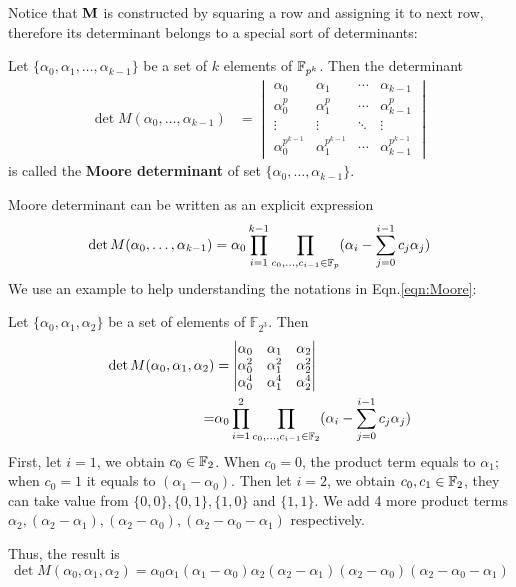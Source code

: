 Notice that ${\bf M}$ is constructed by squaring a row and assigning it to next row,
therefore its determinant belongs to a special sort of determinants:
\begin{Definition}
Let $\{\alpha_0,\alpha_1,\dots,\alpha_{k-1}\}$ be a set of $k$ elements of ${\mathbb{F}}_{p^k}$. Then the determinant
\begin{align}
\det{M(\alpha_0,\dots,\alpha_{k-1})} &= 
\begin{vmatrix}
\alpha_0 & \alpha_1 & \cdots & \alpha_{k-1} \\
\alpha_0^p & \alpha_1^p & \cdots & \alpha_{k-1}^p \\
\vdots & \vdots & \ddots & \vdots \\
\alpha_0^{p^{k-1}} & \alpha_1^{p^{k-1}} & \cdots & \alpha_{k-1}^{p^{k-1}}
\end{vmatrix}
\end{align}
is called the {\bf Moore determinant} of set $\{\alpha_0,\dots,\alpha_{k-1}\}$.
\end{Definition}
Moore determinant can be written as an explicit expression
\begin{equation}
\label{eqn:Moore}
\det{M(\alpha_0,\dots,\alpha_{k-1})} = \alpha_0 \prod_{i=1}^{k-1} \prod_{c_0,\dots,c_{i-1}\in \Fp} (\alpha_{i} - \sum_{j=0}^{i-1}c_j\alpha_j)
\end{equation}
We use an example to help understanding the notations in Eqn.\ref{eqn:Moore}:
\begin{Example}
Let $\{\alpha_0,\alpha_1,\alpha_2\}$ be a set of elements of $\mathbb F_{2^3}$. Then
\begin{align}
\det{M(\alpha_0,\alpha_1,\alpha_2)} &= 
\begin{vmatrix}
\alpha_0 & \alpha_1 & \alpha_2 \\
\alpha_0^2 & \alpha_1^2 & \alpha_2^2 \\
\alpha_0^4 & \alpha_1^4 & \alpha_2^4
\end{vmatrix} \\ \nonumber
=& \alpha_0 \prod_{i=1}^{2} \prod_{c_0,\dots,c_{i-1}\in {\mathbb{F}}_{2}} (\alpha_{i} - \displaystyle\sum_{j=0}^{i-1}c_j\alpha_j)
\end{align}
First, let $i=1$,  we obtain $c_0\in {\mathbb{F}}_{2}$. When $c_0=0$, the product term equals to $\alpha_1$; when $c_0=1$ it equals to $(\alpha_1-\alpha_0)$.
Then let $i=2$, we obtain ${c_0,c_1}\in {\mathbb{F}}_{2}$, they can take value from $\{0,0\},\{0,1\},\{1,0\}$ and $\{1,1\}$.
We add 4 more product terms $\alpha_2,(\alpha_2-\alpha_1),(\alpha_2-\alpha_0),(\alpha_2-\alpha_0-\alpha_1)$ respectively.

Thus, the result is
\begin{equation}
\det{M(\alpha_0,\alpha_1,\alpha_2)} = \alpha_0\alpha_1(\alpha_1-\alpha_0)\alpha_2(\alpha_2-\alpha_1)(\alpha_2-\alpha_0)(\alpha_2-\alpha_0-\alpha_1)
\end{equation}
\end{Example}
